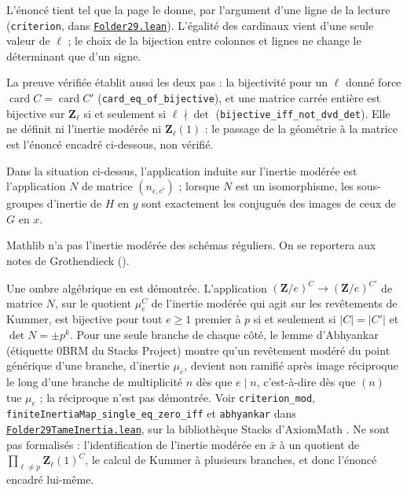 \noindent L'énoncé tient tel que la page le donne, par l'argument d'une ligne de la lecture (\texttt{criterion}, dans \href{\leanblob/AlgebraicGeometry/Folder29.lean}{\texttt{Folder29.\allowbreak{}lean}}). L'égalité des cardinaux vient d'une seule valeur de $\ell$ ; le choix de la bijection entre colonnes et lignes ne change le déterminant que d'un signe.

\noindent La preuve vérifiée établit aussi les deux pas : la bijectivité pour un $\ell$ donné force $\operatorname{card} C = \operatorname{card} C'$ (\texttt{card\_eq\_of\_bijective}), et une matrice carrée entière est bijective sur $\mathbf Z_\ell$ si et seulement si $\ell \nmid \det$ (\texttt{bijective\_iff\_not\_dvd\_det}). Elle ne définit ni l'inertie modérée ni $\mathbf Z_\ell(1)$ : le passage de la géométrie à la matrice est l'énoncé encadré ci-dessous, non vérifié.

\begin{encadre}
\begin{theoreme*}\nonverifie
Dans la situation ci-dessus, l'application induite sur l'inertie modérée est l'application $N$ de matrice $(n_{c,c'})$ ; lorsque $N$ est un isomorphisme, les sous-groupes d'inertie de $H$ en $y$ sont exactement les conjugués des images de ceux de $G$ en $x$.
\end{theoreme*}
\end{encadre}
{\small Mathlib n'a pas l'inertie modérée des schémas réguliers. On se reportera aux notes de Grothendieck ().\par}
{\small Une ombre algébrique en est démontrée. L'application $(\mathbf Z/e)^C \to (\mathbf Z/e)^{C'}$ de matrice $N$, sur le quotient $\mu_e^C$ de l'inertie modérée qui agit sur les revêtements de Kummer, est bijective pour tout $e \geq 1$ premier à $p$ si et seulement si $|C| = |C'|$ et $\det N = \pm p^k$. Pour une seule branche de chaque côté, le lemme d'Abhyankar (étiquette 0BRM du Stacks Project) montre qu'un revêtement modéré du point générique d'une branche, d'inertie $\mu_e$, devient non ramifié après image réciproque le long d'une branche de multiplicité $n$ dès que $e \mid n$, c'est-à-dire dès que $(n)$ tue $\mu_e$ ; la réciproque n'est pas démontrée. Voir \texttt{criterion\_mod}, \texttt{finiteInertiaMap\_single\_eq\_zero\_iff} et \texttt{abhyankar} dans \href{\leanblobmain/AlgebraicGeometry/Folder29TameInertia.lean}{\texttt{Folder29TameInertia.\allowbreak{}lean}}, sur la bibliothèque Stacks d'AxiomMath \cite{axiomstacks}. Ne sont pas formalisés : l'identification de l'inertie modérée en $\bar x$ à un quotient de $\prod_{\ell \neq p} \mathbf Z_\ell(1)^C$, le calcul de Kummer à plusieurs branches, et donc l'énoncé encadré lui-même.\par}

